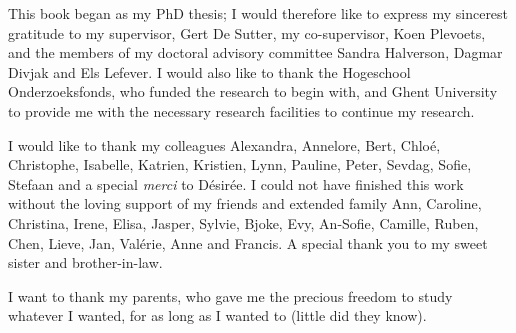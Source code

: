 

This book began as my PhD thesis; I would therefore like to express my sincerest gratitude to my supervisor, Gert De Sutter, my co-supervisor, Koen Plevoets, and the members of my doctoral advisory committee Sandra Halverson, Dagmar Divjak and Els Lefever. I would also like to thank the Hogeschool Onderzoeksfonds, who funded the research to begin with, and Ghent University to provide me with the necessary research facilities to continue my research.



I would like to thank my colleagues Alexandra, Annelore, Bert, Chloé, Christophe, Isabelle, Katrien, Kristien, Lynn, Pauline, Peter, Sevdag, Sofie, Stefaan and a special \textit{merci} to Désirée. I could not have finished this work without the loving support of my friends and extended family Ann, Caroline, Christina, Irene, Elisa, Jasper, Sylvie, Bjoke, Evy, An-Sofie, Camille, Ruben, Chen, Lieve, Jan, Valérie, Anne and Francis. A special thank you to my sweet sister and brother-in-law.



I want to thank my parents, who gave me the precious freedom to study whatever I wanted, for as long as I wanted to (little did they know).

